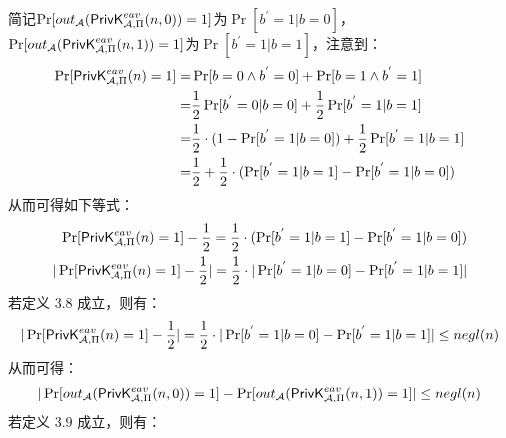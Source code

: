 \begin{questions}
        \begin{solution}
            \newline
            简记$\Pr[out_{\mathcal{A}}(\mathsf{PrivK}^{eav}_{\mathcal{A},\Pi}(n,0))=1]$为$\Pr[{b}^{'}=1|b=0]$，$\Pr[out_{\mathcal{A}}(\mathsf{PrivK}^{eav}_{\mathcal{A},\Pi}(n,1))=1]$为$\Pr[{b}^{'}=1|b=1]$，注意到：
            \begin{equation}
                \begin{aligned}
                    \Pr[\mathsf{PrivK}^{eav}_{\mathcal{A},\Pi}(n)=1]=&\Pr[b=0\wedge{b}^{'}=0]+\Pr[b=1\wedge{b}^{'}=1]\\
                    =&\frac{1}{2}\Pr[{b}^{'}=0|b=0]+\frac{1}{2}\Pr[{b}^{'}=1|b=1]\\
                    =&\frac{1}{2}\cdot(1-\Pr[{b}^{'}=1|b=0])+\frac{1}{2}\Pr[{b}^{'}=1|b=1]\\
                    =&\frac{1}{2}+\frac{1}{2}\cdot(\Pr[{b}^{'}=1|b=1]-\Pr[{b}^{'}=1|b=0])
                \end{aligned}
            \end{equation}
            从而可得如下等式：
            \begin{equation}
                \begin{aligned}
                    \Pr[\mathsf{PrivK}^{eav}_{\mathcal{A},\Pi}(n)=1]-\frac{1}{2}=\frac{1}{2}\cdot(\Pr[{b}^{'}=1|b=1]-\Pr[{b}^{'}=1|b=0])\\
                    |\Pr[\mathsf{PrivK}^{eav}_{\mathcal{A},\Pi}(n)=1]-\frac{1}{2}|=\frac{1}{2}\cdot|\Pr[{b}^{'}=1|b=0]-\Pr[{b}^{'}=1|b=1]|
                \end{aligned}
            \end{equation}
            若定义 3.8 成立，则有：
            \begin{equation}
                \begin{aligned}
                    |\Pr[\mathsf{PrivK}^{eav}_{\mathcal{A},\Pi}(n)=1]-\frac{1}{2}|=\frac{1}{2}\cdot|\Pr[{b}^{'}=1|b=0]-\Pr[{b}^{'}=1|b=1]|\leq{negl}(n)
                \end{aligned}
            \end{equation}
            从而可得：
            \begin{equation}
                \begin{aligned}
                    |\Pr[out_{\mathcal{A}}(\mathsf{PrivK}^{eav}_{\mathcal{A},\Pi}(n,0))=1]-\Pr[out_{\mathcal{A}}(\mathsf{PrivK}^{eav}_{\mathcal{A},\Pi}(n,1))=1]|\leq{negl}(n)
                \end{aligned}
            \end{equation}
            若定义 3.9 成立，则有：

\end{solution}
\end{questions}
